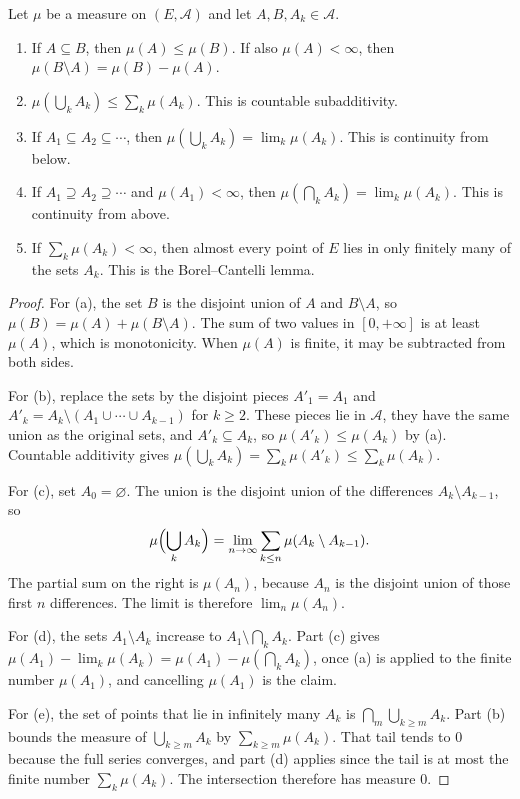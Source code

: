 \begin{proposition}\label{prop:measureprops}
Let $\mu$ be a measure on $(E,\mathcal A)$ and let $A,B,A_k\in\mathcal A$.
\begin{enumerate}[label=(\alph*)]
\item If $A\subseteq B$, then $\mu(A)\le\mu(B)$. If also $\mu(A)<\infty$, then $\mu(B\setminus A)=\mu(B)-\mu(A)$.
\item $\mu(\bigcup_k A_k)\le\sum_k\mu(A_k)$. This is countable subadditivity.
\item If $A_1\subseteq A_2\subseteq\cdots$, then $\mu(\bigcup_k A_k)=\lim_k\mu(A_k)$. This is continuity from below.
\item If $A_1\supseteq A_2\supseteq\cdots$ and $\mu(A_1)<\infty$, then $\mu(\bigcap_k A_k)=\lim_k\mu(A_k)$. This is continuity from above.
\item If $\sum_k\mu(A_k)<\infty$, then almost every point of $E$ lies in only finitely many of the sets $A_k$. This is the Borel--Cantelli lemma.
\end{enumerate}
\end{proposition}
\begin{proof}
For (a), the set $B$ is the disjoint union of $A$ and $B\setminus A$, so $\mu(B)=\mu(A)+\mu(B\setminus A)$.
The sum of two values in $[0,+\infty]$ is at least $\mu(A)$, which is monotonicity.
When $\mu(A)$ is finite, it may be subtracted from both sides.

For (b), replace the sets by the disjoint pieces $A'_1=A_1$ and $A'_k=A_k\setminus(A_1\cup\cdots\cup A_{k-1})$ for $k\ge2$.
These pieces lie in $\mathcal A$, they have the same union as the original sets, and $A'_k\subseteq A_k$, so $\mu(A'_k)\le\mu(A_k)$ by (a).
Countable additivity gives $\mu(\bigcup_k A_k)=\sum_k\mu(A'_k)\le\sum_k\mu(A_k)$.

For (c), set $A_0=\varnothing$.
The union is the disjoint union of the differences $A_k\setminus A_{k-1}$, so
\[
\mu\Bigl(\bigcup_k A_k\Bigr)=\lim_{n\to\infty}\sum_{k\le n}\mu(A_k\setminus A_{k-1}).
\]
The partial sum on the right is $\mu(A_n)$, because $A_n$ is the disjoint union of those first $n$ differences.
The limit is therefore $\lim_n\mu(A_n)$.

For (d), the sets $A_1\setminus A_k$ increase to $A_1\setminus\bigcap_k A_k$.
Part (c) gives $\mu(A_1)-\lim_k\mu(A_k)=\mu(A_1)-\mu(\bigcap_k A_k)$, once (a) is applied to the finite number $\mu(A_1)$, and cancelling $\mu(A_1)$ is the claim.

For (e), the set of points that lie in infinitely many $A_k$ is $\bigcap_m\bigcup_{k\ge m}A_k$.
Part (b) bounds the measure of $\bigcup_{k\ge m}A_k$ by $\sum_{k\ge m}\mu(A_k)$.
That tail tends to $0$ because the full series converges, and part (d) applies since the tail is at most the finite number $\sum_k\mu(A_k)$.
The intersection therefore has measure $0$.
\end{proof}

